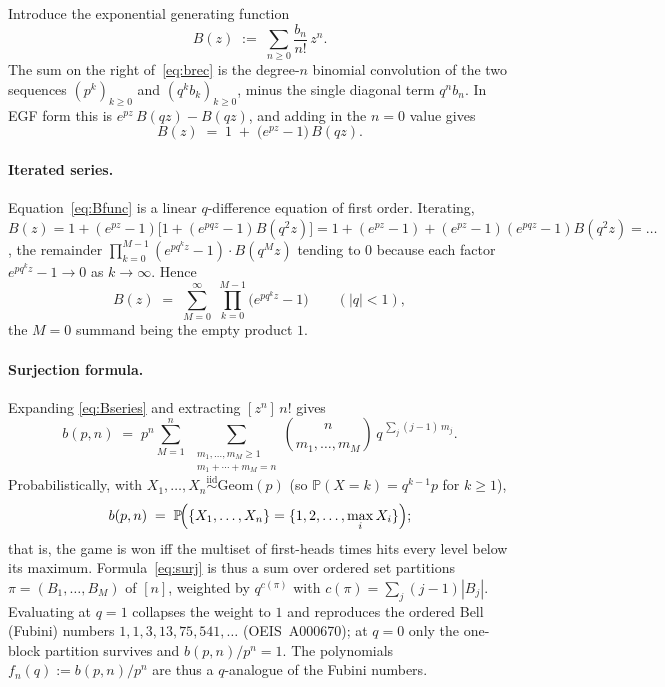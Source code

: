 \documentclass[11pt]{article}
\theoremstyle{definition}
\renewcommand{\P}{\mathbb{P}}
\begin{document}
Introduce the exponential generating function
\[
  B(z) \;:=\; \sum_{n\ge 0}\frac{b_n}{n!}\,z^n.
\]
The sum on the right of~\eqref{eq:brec} is the degree-$n$ binomial
convolution of the two sequences $(p^k)_{k\ge 0}$ and $(q^k b_k)_{k\ge
0}$, minus the single diagonal term $q^n b_n$. In EGF form this is
$e^{pz}\,B(qz)-B(qz)$, and adding in the $n=0$ value gives
\begin{equation}\label{eq:Bfunc}
  \boxed{\;B(z) \;=\; 1 \;+\; \bigl(e^{pz}-1\bigr)\,B(qz).\;}
\end{equation}

\paragraph{Iterated series.} Equation~\eqref{eq:Bfunc} is a linear
$q$-difference equation of first order. Iterating,
$B(z) = 1 + (e^{pz}-1)\bigl[1 + (e^{pqz}-1)B(q^2z)\bigr] = 1 +
(e^{pz}-1) + (e^{pz}-1)(e^{pqz}-1)B(q^2z) = \ldots$, the remainder
$\prod_{k=0}^{M-1}(e^{pq^kz}-1)\cdot B(q^Mz)$ tending to $0$ because
each factor $e^{pq^kz}-1\to 0$ as $k\to\infty$. Hence
\begin{equation}\label{eq:Bseries}
  B(z) \;=\; \sum_{M=0}^{\infty}\;\prod_{k=0}^{M-1}\bigl(e^{p q^k z}-1\bigr)
  \qquad (|q|<1),
\end{equation}
the $M=0$ summand being the empty product $1$.

\paragraph{Surjection formula.} Expanding \eqref{eq:Bseries} and
extracting $[z^n]\,n!$ gives
\begin{equation}\label{eq:surj}
  b(p,n) \;=\; p^n\sum_{M=1}^{n}\;
  \sum_{\substack{m_1,\dots,m_M\ge 1\\ m_1+\cdots+m_M=n}}
  \binom{n}{m_1,\ldots,m_M}\,q^{\,\sum_{j}(j-1)\,m_j}.
\end{equation}
Probabilistically, with $X_1,\ldots,X_n\stackrel{\text{iid}}{\sim}\mathrm{Geom}(p)$ (so
$\P(X=k)=q^{k-1}p$ for $k\ge 1$),
\begin{equation}\label{eq:prob-interp}
  b(p,n) \;=\; \P\!\Bigl(\{X_1,\ldots,X_n\}=\{1,2,\ldots,\max_iX_i\}\Bigr);
\end{equation}
that is, the game is won iff the multiset of first-heads times hits
every level below its maximum. Formula~\eqref{eq:surj} is thus a sum
over ordered set partitions $\pi=(B_1,\ldots,B_M)$ of $[n]$, weighted
by $q^{c(\pi)}$ with $c(\pi)=\sum_{j}(j-1)|B_j|$. Evaluating at $q=1$
collapses the weight to $1$ and reproduces the ordered Bell
(Fubini) numbers $1,1,3,13,75,541,\ldots$ (OEIS~A000670); at $q=0$ only
the one-block partition survives and $b(p,n)/p^n=1$. The polynomials
$f_n(q):=b(p,n)/p^n$ are thus a $q$-analogue of the Fubini numbers.
\end{document}
